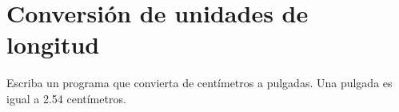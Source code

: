 \section{Conversión de unidades de longitud}

Escriba un programa que convierta de centímetros a pulgadas. Una pulgada
es igual a 2.54 centímetros.
